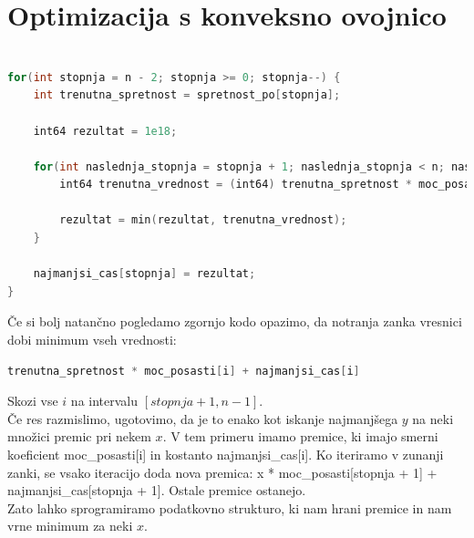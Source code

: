\section{Optimizacija s konveksno ovojnico}\label{sec:optimizacija-s-konveksno-ovojnico}

\begin{lstlisting}[label={lst:code3}, language=C++]

for(int stopnja = n - 2; stopnja >= 0; stopnja--) {
    int trenutna_spretnost = spretnost_po[stopnja];

    int64 rezultat = 1e18;

    for(int naslednja_stopnja = stopnja + 1; naslednja_stopnja < n; naslednja_stopnja++) {
        int64 trenutna_vrednost = (int64) trenutna_spretnost * moc_posasti[naslednja_stopnja] + najmanjsi_cas[naslednja_stopnja];

        rezultat = min(rezultat, trenutna_vrednost);
    }

    najmanjsi_cas[stopnja] = rezultat;
}

\end{lstlisting}

Če si bolj natančno pogledamo zgornjo kodo opazimo, da notranja zanka vresnici dobi minimum vseh vrednosti:

\begin{lstlisting}[label={lst:code4}, language=C++]
    trenutna_spretnost * moc_posasti[i] + najmanjsi_cas[i]
\end{lstlisting}

Skozi vse $i$ na intervalu $[stopnja+1, n-1]$.
\\
Če res razmislimo, ugotovimo, da je to enako kot iskanje najmanjšega $y$ na neki množici premic pri nekem $x$.
V tem primeru imamo premice, ki imajo smerni koeficient moc\_posasti[i] in kostanto najmanjsi\_cas[i].
Ko iteriramo v zunanji zanki, se vsako iteracijo doda nova premica: x * moc\_posasti[stopnja + 1] + najmanjsi\_cas[stopnja + 1].
Ostale premice ostanejo.
\\
Zato lahko sprogramiramo podatkovno strukturo, ki nam hrani premice in nam vrne minimum za neki $x$.

